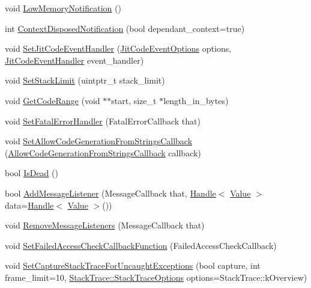 \begin{DoxyCompactItemize}
\item 
void \hyperlink{classv8_1_1_isolate_aaf446f4877e4707a93d2c406fffd9fd6}{Low\+Memory\+Notification} ()
\item 
int \hyperlink{classv8_1_1_isolate_a4b5216bbb1792211422aee575d02f442}{Context\+Disposed\+Notification} (bool dependant\+\_\+context=true)
\item 
void \hyperlink{classv8_1_1_isolate_a71d976355bf47eb2dd09cd5d1279a40d}{Set\+Jit\+Code\+Event\+Handler} (\hyperlink{namespacev8_a06f34fa4fa4cfc8518366808d1d461c1}{Jit\+Code\+Event\+Options} options, \hyperlink{namespacev8_a39243bc91e63d64d111452fdb98c4733}{Jit\+Code\+Event\+Handler} event\+\_\+handler)
\item 
void \hyperlink{classv8_1_1_isolate_addbbe14af7efb92999ac3944bc9ffed5}{Set\+Stack\+Limit} (uintptr\+\_\+t stack\+\_\+limit)
\item 
void \hyperlink{classv8_1_1_isolate_a46c7fb2282970530c32740d7e5999b22}{Get\+Code\+Range} (void $\ast$$\ast$start, size\+\_\+t $\ast$length\+\_\+in\+\_\+bytes)
\item 
void \hyperlink{classv8_1_1_isolate_a131f1e2e6a80618ac3c8c266a041851d}{Set\+Fatal\+Error\+Handler} (Fatal\+Error\+Callback that)
\item 
void \hyperlink{classv8_1_1_isolate_ad91199faf0a599c69539af01f5df44e9}{Set\+Allow\+Code\+Generation\+From\+Strings\+Callback} (\hyperlink{namespacev8_a521d909ec201742a1cb35d50a8e2a3c2}{Allow\+Code\+Generation\+From\+Strings\+Callback} callback)
\item 
bool \hyperlink{classv8_1_1_isolate_a603a9bc7860d7936bce2dd45829869c3}{Is\+Dead} ()
\item 
bool \hyperlink{classv8_1_1_isolate_ae160d90f70a522dca66b8929762598a2}{Add\+Message\+Listener} (Message\+Callback that, \hyperlink{classv8_1_1_handle}{Handle}$<$ \hyperlink{classv8_1_1_value}{Value} $>$ data=\hyperlink{classv8_1_1_handle}{Handle}$<$ \hyperlink{classv8_1_1_value}{Value} $>$())
\item 
void \hyperlink{classv8_1_1_isolate_a0319e55b26ba3ac51d867b37b917a21f}{Remove\+Message\+Listeners} (Message\+Callback that)
\item 
void \hyperlink{classv8_1_1_isolate_ab9ef29fc049d82e0c33994632b4f6ba6}{Set\+Failed\+Access\+Check\+Callback\+Function} (Failed\+Access\+Check\+Callback)
\item 
void \hyperlink{classv8_1_1_isolate_a0ea70b9953abf15184a20eba6aab389f}{Set\+Capture\+Stack\+Trace\+For\+Uncaught\+Exceptions} (bool capture, int frame\+\_\+limit=10, \hyperlink{classv8_1_1_stack_trace_a9704e4a37949eb8eb8ccddbddf161492}{Stack\+Trace\+::\+Stack\+Trace\+Options} options=Stack\+Trace\+::k\+Overview)
$$
\end{DoxyCompactItemize}
